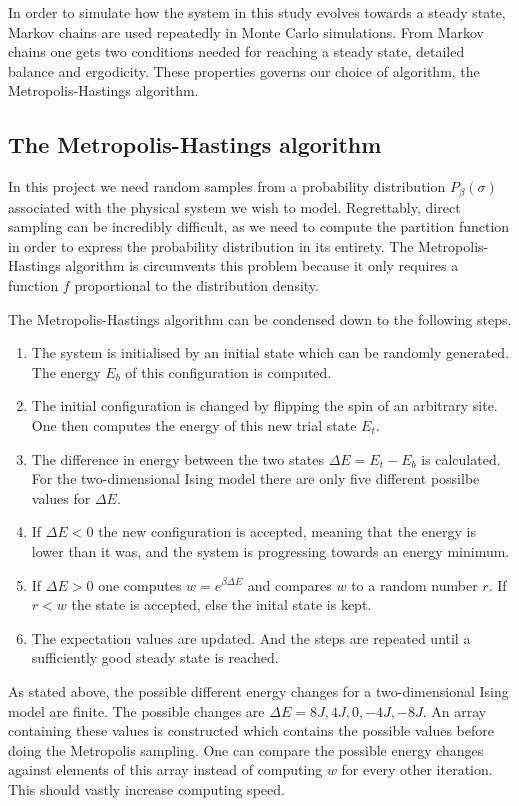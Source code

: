 \documentclass[10pt,a4paper]{amsart}
\begin{document}
In order to simulate how the system in this study evolves towards a steady state, Markov chains are used repeatedly in Monte Carlo simulations. From Markov chains one gets two conditions needed for reaching a steady state, detailed balance and ergodicity. These properties governs our choice of algorithm, the Metropolis-Hastings algorithm.

\subsection{The Metropolis-Hastings algorithm}
In this project we need random samples from a probability distribution $P_\beta (\sigma)$ associated with the physical system we wish to model. Regrettably, direct sampling can be incredibly difficult, as we need to compute the partition function in order to express the probability distribution in its entirety. The Metropolis-Hastings algorithm is circumvents this problem because it only requires a function $f$ proportional to the distribution density.

The Metropolis-Hastings algorithm can be condensed down to the following steps.
\begin{enumerate}
\item The system is initialised by an initial state which can be randomly generated. The energy $E_b$ of this configuration is computed.
\item The initial configuration is changed by flipping the spin of an arbitrary site. One then computes the energy of this new trial state $E_t$.
\item The difference in energy between the two states $\Delta E = E_t - E_b$ is calculated. For the two-dimensional Ising model there are only five different possilbe values for $\Delta E$.
\item If $ \Delta E < 0$ the new configuration is accepted, meaning that the energy is lower than it was, and the system is progressing towards an energy minimum.
\item If $ \Delta E > 0$ one computes $w = e^{\beta \Delta E}$ and compares $w$ to a random number $r$. If $r < w$ the state is accepted, else the inital state is kept.
\item The expectation values are updated. And the steps are repeated until a sufficiently good steady state is reached.
\end{enumerate}

As stated above, the possible different energy changes for a two-dimensional Ising model are finite. The possible changes are $\Delta E = 8J, 4J, 0, -4J, -8J$.  An array containing these values is constructed which contains the possible values before doing the Metropolis sampling. One can compare the possible energy changes against elements of this array instead of computing $w$ for every other iteration. This should vastly increase computing speed.
\end{document}
